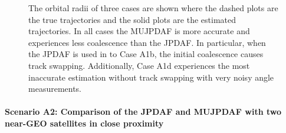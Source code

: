 \documentclass[letterpaper, paper,10pt]{AAS}		%
\begin{document}
\begin{figure}
{
\centerline{
	}
\centerline{
	}
\centerline{
	}
}
\caption{The orbital radii of three cases are shown where the dashed plots are the true trajectories and the solid plots are the estimated trajectories.
In all cases the MUJPDAF is more accurate and experiences less coalescence than the JPDAF.
In particular, when the JPDAF is used in to Case A1b, the initial coalescence causes track swapping.
Additionally, Case A1d experiences the most inaccurate estimation without track swapping with very noisy angle measurements.
}\label{fig:A1}
\end{figure}















\paragraph*{Scenario A2: Comparison of the JPDAF and MUJPDAF with two near-GEO satellites in close proximity}
\end{document}
